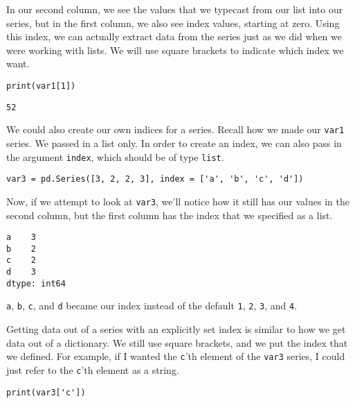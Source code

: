 In our second column, we see the values that we typecast from our list into our series, but in the first column, we also see index values, starting at zero. Using this index, we can actually extract data from the series just as we did when we were working with lists. We will use square brackets to indicate which index we want.
\begin{lstlisting}[style=pippython]
print(var1[1])
\end{lstlisting}
\begin{lstlisting}
52
\end{lstlisting}\par
{}\par
We could also create our own indices for a series. Recall how we made our \verb|var1| series. We passed in a list only. In order to create an index, we can also pass in the argument \verb|index|, which should be of type \verb|list|.\par
\begin{lstlisting}[style=pippython]
var3 = pd.Series([3, 2, 2, 3], index = ['a', 'b', 'c', 'd'])
\end{lstlisting}
Now, if we attempt to look at \verb|var3|, we'll notice how it still has our values in the second column, but the first column has the index that we specified as a list.\par
\begin{lstlisting}
a    3
b    2
c    2
d    3
dtype: int64
\end{lstlisting}
\verb|a|, \verb|b|, \verb|c|, and \verb|d| became our index instead of the default \verb|1|, \verb|2|, \verb|3|, and \verb|4|.\par
{}
Getting data out of a series with an explicitly set index is similar to how we get data out of a dictionary. We still use square brackets, and we put the index that we defined. For example, if I wanted the \verb|c|'th element of the \verb|var3| series, I could just refer to the \verb|c|'th element as a string.\par
\begin{lstlisting}[style=pippython]
print(var3['c'])
\end{lstlisting}
